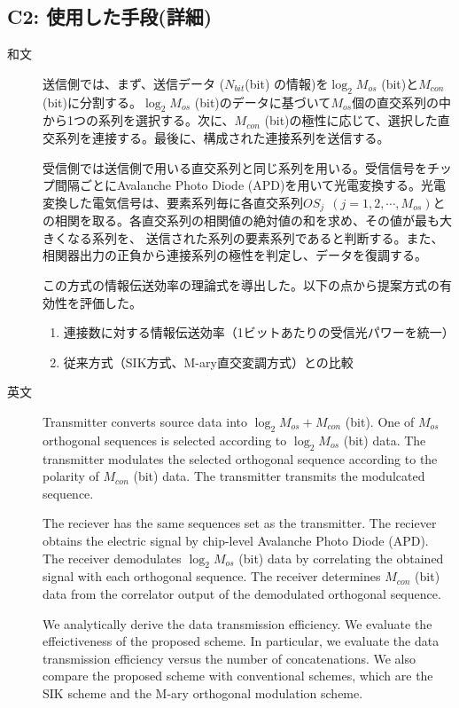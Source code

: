 ﻿\documentclass[a4j,10pt]{jarticle}
\begin{document}
\subsection{C2: 使用した手段(詳細)} %
\begin{description}
 \item[和文] 送信側では、まず、送信データ ($N_{bit}$(bit) の情報)を$\log_2 M_{os}$ (bit)と$M_{con}$ (bit)に分割する。$\log_2 M_{os}$ (bit)のデータに基づいて$M_{os}$個の直交系列の中から1つの系列を選択する。次に、$M_{con}$ (bit)の極性に応じて、選択した直交系列を連接する。最後に、構成された連接系列を送信する。

受信側では送信側で用いる直交系列と同じ系列を用いる。受信信号をチップ間隔ごとにAvalanche Photo Diode (APD)を用いて光電変換する。光電変換した電気信号は、要素系列毎に各直交系列$OS_{j}~~(j=1,2, \cdots, M_{os})$との相関を取る。各直交系列の相関値の絶対値の和を求め、その値が最も大きくなる系列を、
送信された系列の要素系列であると判断する。また、相関器出力の正負から連接系列の極性を判定し、データを復調する。

この方式の情報伝送効率の理論式を導出した。以下の点から提案方式の有効性を評価した。
\begin{enumerate}
 \item 連接数に対する情報伝送効率（1ビットあたりの受信光パワーを統一）
 \item 従来方式（SIK方式、M-ary直交変調方式）との比較
\end{enumerate}
%
 \item[英文] Transmitter converts source data into $\log_2 M_{os} + M_{con}$ (bit). One of $M_{os}$ orthogonal sequences is selected according to $\log_2 M_{os}$ (bit) data. The transmitter modulates the selected orthogonal sequence according to the polarity of $M_{con}$ (bit) data. The transmitter transmits the modulcated sequence. 

The reciever has the same sequences set as the transmitter. The reciever obtains the electric signal by chip-level Avalanche Photo Diode (APD). The receiver demodulates $\log_2 M_{os}$ (bit) data by correlating the obtained signal with each orthogonal sequence. The receiver determines $M_{con}$ (bit) data from the correlator output of the demodulated orthogonal sequence. 

We analytically derive the data transmission efficiency. We evaluate the effeictiveness of the proposed scheme. In particular, we evaluate the data transmission efficiency versus the number of concatenations. We also compare the proposed scheme with conventional schemes, which are the SIK scheme and the M-ary orthogonal modulation scheme. 
%
\end{description}
%
\end{document}
